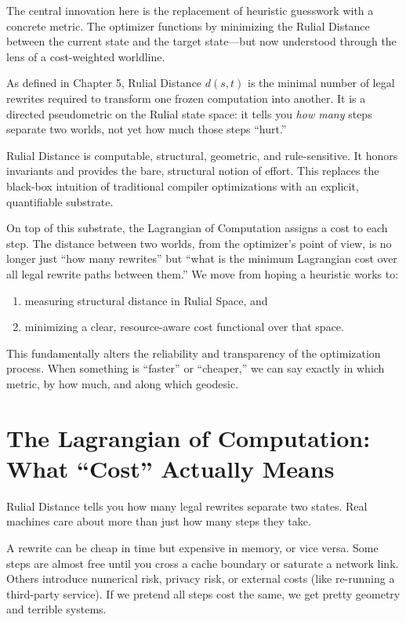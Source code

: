 The central innovation here is the replacement of heuristic guesswork with a concrete metric. The optimizer functions by minimizing the Rulial Distance between the current state and the target state—but now understood through the lens of a cost-weighted worldline.

As defined in Chapter 5, Rulial Distance $d(s,t)$ is the minimal number of legal rewrites required to transform one frozen computation into another. It is a directed pseudometric on the Rulial state space: it tells you \emph{how many} steps separate two worlds, not yet how much those steps ``hurt.''

Rulial Distance is computable, structural, geometric, and rule-sensitive. It honors invariants and provides the bare, structural notion of effort. This replaces the black-box intuition of traditional compiler optimizations with an explicit, quantifiable substrate.

On top of this substrate, the Lagrangian of Computation assigns a cost to each step. The distance between two worlds, from the optimizer's point of view, is no longer just ``how many rewrites'' but ``what is the minimum Lagrangian cost over all legal rewrite paths between them.'' We move from hoping a heuristic works to:

\begin{enumerate}
  \item measuring structural distance in Rulial Space, and
  \item minimizing a clear, resource-aware cost functional over that space.
\end{enumerate}

This fundamentally alters the reliability and transparency of the optimization process. When something is ``faster'' or ``cheaper,'' we can say exactly in which metric, by how much, and along which geodesic.

\section{The Lagrangian of Computation: What ``Cost'' Actually Means}
\label{lagrangian-of-computation}

Rulial Distance tells you how many legal rewrites separate two states. Real machines care about more than just how many steps they take.

A rewrite can be cheap in time but expensive in memory, or vice versa. Some steps are almost free until you cross a cache boundary or saturate a network link. Others introduce numerical risk, privacy risk, or external costs (like re-running a third-party service). If we pretend all steps cost the same, we get pretty geometry and terrible systems.

